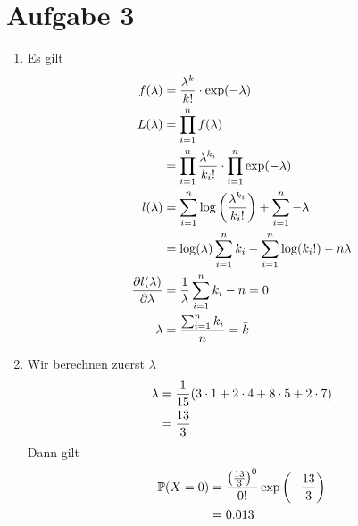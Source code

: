 \documentclass{article}
\begin{document}
	\section*{Aufgabe 3}
	\begin{enumerate}[label=(\alph*)]
		\item Es gilt
		\begin{align}
			f(\lambda) &= \frac{\lambda^k}{k!}\cdot\exp(-\lambda) \notag \\
			L(\lambda) &= \prod_{i=1}^n f(\lambda) \notag \\
			&= \prod_{i=1}^n \frac{\lambda^{k_i}}{k_i!} \cdot\prod_{i=1}^n \exp(-\lambda) \notag \\
			l(\lambda) &= \sum_{i=1}^n \log\left(\frac{\lambda^{k_i}}{k_i!}\right) + \sum_{i=1}^n -\lambda \notag \\
			&= \log(\lambda)\sum_{i=1}^n k_i - \sum_{i=1}^n\log(k_i!) - n\lambda \notag \\
			\frac{\partial l(\lambda)}{\partial\lambda} &= \frac{1}{\lambda}\sum_{i=1}^n k_i - n=0 \notag \\
			\lambda &= \frac{\sum_{i=1}^n k_i}{n} = \bar{k} \notag
		\end{align}
		\item Wir berechnen zuerst $\lambda$
		\begin{align}
			\lambda &= \frac{1}{15}(3\cdot 1 + 2\cdot 4 + 8\cdot 5 + 2\cdot 7) \notag \\
			&= \frac{13}{3} \notag
		\end{align}
		Dann gilt
		\begin{align}
			\mathbb{P}(X=0) &= \frac{\left(\frac{13}{3}\right)^0}{0!} \exp\left(-\frac{13}{3}\right) \notag \\
			&= 0.013 \notag
		\end{align}
	\end{enumerate}
\end{document}
